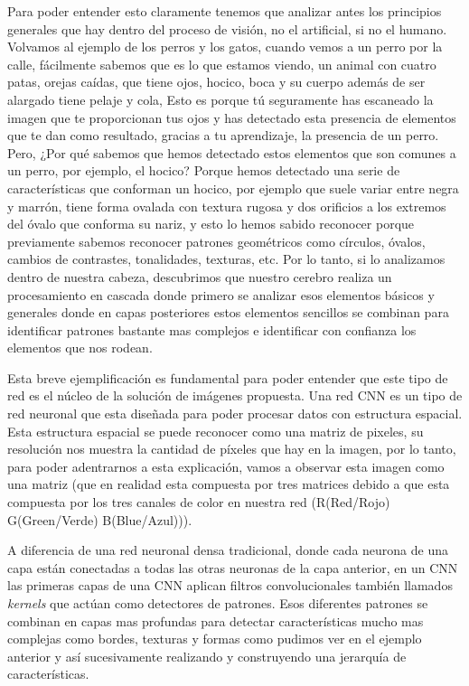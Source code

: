 Para poder entender esto claramente tenemos que analizar antes los principios generales que hay dentro del proceso de visión, no el artificial, si no el humano. Volvamos al ejemplo de los perros y los gatos, cuando vemos a un perro por la calle, fácilmente sabemos que es lo que estamos viendo, un animal con cuatro patas, orejas caídas, que tiene ojos, hocico, boca y su cuerpo además de ser alargado tiene pelaje y cola, Esto es porque tú seguramente has escaneado la imagen que te proporcionan tus ojos y has detectado esta presencia de elementos que te dan como resultado, gracias a tu aprendizaje, la presencia de un perro. Pero, ¿Por qué sabemos que hemos detectado estos elementos que son comunes a un perro, por ejemplo, el hocico? Porque hemos detectado una serie de características que conforman un hocico, por ejemplo que suele variar entre negra y marrón, tiene forma ovalada con textura rugosa y dos orificios a los extremos del óvalo que conforma su nariz, y esto lo hemos sabido reconocer porque previamente sabemos reconocer patrones geométricos como círculos, óvalos, cambios de contrastes, tonalidades, texturas, etc. Por lo tanto, si lo analizamos dentro de nuestra cabeza, descubrimos que nuestro cerebro realiza un procesamiento en cascada donde primero se analizar esos elementos básicos y generales donde en capas posteriores estos elementos sencillos se combinan para identificar patrones bastante mas complejos e identificar con confianza los elementos que nos rodean.

Esta breve ejemplificación es fundamental para poder entender que este tipo de red es el núcleo de la solución de imágenes propuesta. Una red CNN es un tipo de red neuronal que esta diseñada para poder procesar datos con estructura espacial. Esta estructura espacial se puede reconocer como una matriz de pixeles, su resolución nos muestra la cantidad de píxeles que hay en la imagen, por lo tanto, para poder adentrarnos a esta explicación, vamos a observar esta imagen como una matriz (que en realidad esta compuesta por tres matrices debido a que esta compuesta por los tres canales de color en nuestra red (R(Red/Rojo) G(Green/Verde) B(Blue/Azul))).

A diferencia de una red neuronal densa tradicional, donde cada neurona de una capa están conectadas a todas las otras neuronas de la capa anterior, en un CNN las primeras capas de una CNN aplican filtros convolucionales también llamados \textit{kernels} que actúan como detectores de patrones. Esos diferentes patrones se combinan en capas mas profundas para detectar características mucho mas complejas como bordes, texturas y formas como pudimos ver en el ejemplo anterior y así sucesivamente realizando y construyendo una jerarquía de características.

